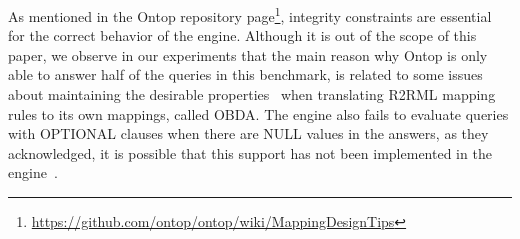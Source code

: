 As mentioned in the Ontop repository page\footnote{\url{https://github.com/ontop/ontop/wiki/MappingDesignTips}}, integrity constraints are essential for the correct behavior of the engine. Although it is out of the scope of this paper, we observe in our experiments that the main reason why Ontop is only able to answer half of the queries in this benchmark, is related to some issues about maintaining the desirable properties~\cite{corcho2019towards} when translating R2RML mapping rules to its own mappings, called OBDA. The engine also fails to evaluate queries with OPTIONAL clauses when there are NULL values in the answers, as they acknowledged, it is possible that this support has not been implemented in the engine~\cite{xiao2018efficient}.

\begin{figure}[th]
  \centering
  \qquad
\end{figure}
